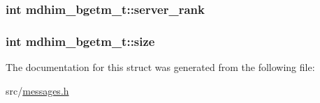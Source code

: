 \hypertarget{structmdhim__bgetm__t_a33b8bbb7a13cf0773954c22b18cac4f4}{
\subsubsection[{server\-\_\-rank}]{\setlength{\rightskip}{0pt plus 5cm}int mdhim\-\_\-bgetm\-\_\-t\-::server\-\_\-rank}}\label{structmdhim__bgetm__t_a33b8bbb7a13cf0773954c22b18cac4f4}
\hypertarget{structmdhim__bgetm__t_aa2fc1aff991240e630c426100b3ee7c0}{
\subsubsection[{size}]{\setlength{\rightskip}{0pt plus 5cm}int mdhim\-\_\-bgetm\-\_\-t\-::size}}\label{structmdhim__bgetm__t_aa2fc1aff991240e630c426100b3ee7c0}


The documentation for this struct was generated from the following file\-:\begin{DoxyCompactItemize}
\item 
src/\hyperlink{messages_8h}{messages.\-h}\end{DoxyCompactItemize}
